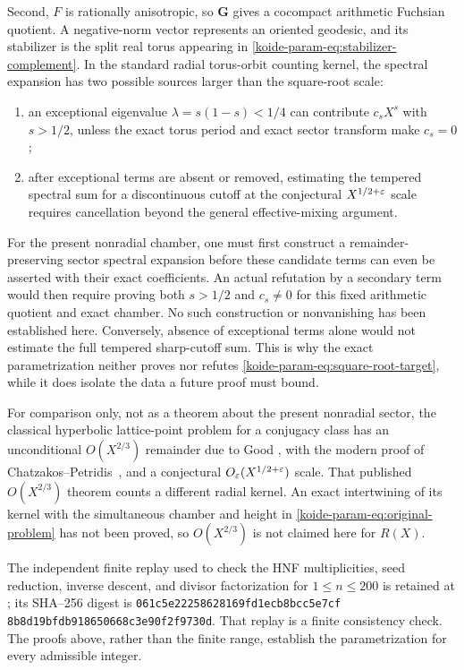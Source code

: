 Second, $F$ is rationally anisotropic, so $\mathbf G$ gives a cocompact
arithmetic Fuchsian quotient.  A negative-norm vector represents an
oriented geodesic, and its stabilizer is the split real torus appearing in
\eqref{koide-param-eq:stabilizer-complement}.  In the standard radial torus-orbit
counting kernel, the spectral expansion has two possible sources larger
than the square-root scale:
\begin{enumerate}
 \item an exceptional eigenvalue $\lambda=s(1-s)<1/4$ can contribute
 $c_sX^s$ with $s>1/2$, unless the exact torus period and exact sector
 transform make $c_s=0$;
 \item after exceptional terms are absent or removed, estimating the
 tempered spectral sum for a discontinuous cutoff at the conjectural
 $X^{1/2+\varepsilon}$ scale requires cancellation beyond the general
 effective-mixing argument.
\end{enumerate}
For the present nonradial chamber, one must first construct a
remainder-preserving sector spectral expansion before these candidate
terms can even be asserted with their exact coefficients.  An actual
refutation by a secondary term would then require proving both $s>1/2$
and $c_s\ne0$ for this fixed arithmetic quotient and exact chamber.  No
such construction or nonvanishing has been established here.  Conversely,
absence of exceptional terms alone would not estimate the full tempered
sharp-cutoff sum.  This is why the exact parametrization neither proves
nor refutes \eqref{koide-param-eq:square-root-target}, while it does isolate the data a
future proof must bound.

For comparison only, not as a theorem about the present nonradial sector,
the classical hyperbolic lattice-point problem for a conjugacy class has
an unconditional $O(X^{2/3})$ remainder due to Good
\cite[Theorem~4]{Good_1983}, with the modern proof of
Chatzakos--Petridis~\cite[Theorem~1.1 and Conjecture~5.7]{ChatzakosPetridis_2016},
and a conjectural $O_\varepsilon(X^{1/2+\varepsilon})$ scale.  That
published $O(X^{2/3})$ theorem counts a different radial kernel.  An exact
intertwining of its kernel with the simultaneous chamber and height in
\eqref{koide-param-eq:original-problem} has not been proved, so $O(X^{2/3})$ is not
claimed here for $R(X)$.

The independent finite replay used to check the HNF multiplicities, seed
reduction, inverse descent, and divisor factorization for \(1\leq n\leq200\)
is retained at
;
its SHA--256 digest is
\texttt{061c5e22258628169fd1ecb8bcc5e7cf\allowbreak%
8b8d19bfdb918650668c3e90f2f9730d}.
That replay is a finite consistency check.  The proofs above, rather than the
finite range, establish the parametrization for every admissible integer.

